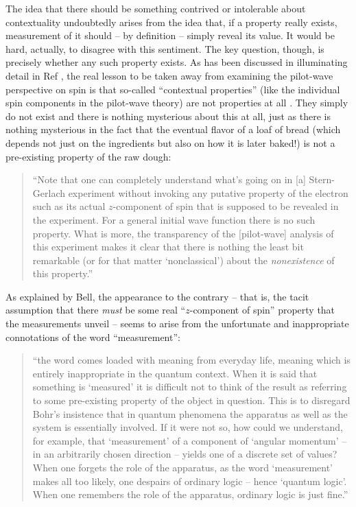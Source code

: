 \documentclass[aps,prc,onecolumn,letterpaper,floatfix,12pt]{revtex4}
\begin{document}
The idea that there should be something contrived or intolerable about
contextuality undoubtedly arises from the idea that, if a property
really exists, measurement of it should -- by definition -- 
simply reveal its value.  It
would be hard, actually, to disagree with this sentiment.  The key
question, though, is precisely whether any such property exists.  As
has been discussed in illuminating detail in Ref \cite{nrao},
the real lesson to be taken away from examining the
pilot-wave perspective on spin is that so-called ``contextual
properties'' (like the individual spin components in the pilot-wave
theory) are not properties at all \cite{history}.  They simply do not exist and
there is nothing mysterious about this at all, just as there is
nothing mysterious in the fact that the 
eventual flavor of a loaf of bread (which depends not just on
the ingredients but also on how it is later baked!) is not a pre-existing
property of the raw dough:
\begin{quote}
``Note that one can completely understand what's going on in
[a] Stern-Gerlach experiment without invoking any putative property of
the electron such as its actual $z$-component of spin that is supposed
to be revealed in the experiment.  For a general initial wave function
there is no such property.  What is more, the transparency of the [pilot-wave]
analysis of this experiment makes it clear that there is nothing the
least bit remarkable (or for that matter `nonclassical') about the
\emph{nonexistence} of this property.''  \cite{qeop}
\end{quote}
As explained by Bell, the appearance to the contrary -- that is, the
tacit assumption that there \emph{must} be some real ``$z$-component
of spin'' property that the measurements unveil -- seems to arise from
the unfortunate and inappropriate connotations of the word
``measurement'':  
\begin{quote}
``the word comes loaded with meaning from everyday life, meaning which
is entirely inappropriate in the quantum context.  When it is said
that something is `measured' it is difficult not to think of the
result as referring to some pre-existing property of the object in
question.  This is to disregard Bohr's insistence that in quantum
phenomena the apparatus as well as the system is essentially
involved.  If it were not so, how could we understand, for example,
that `measurement' of a component of `angular momentum' -- in an
arbitrarily chosen direction -- yields one of a discrete set of
values?  When one forgets the role of the apparatus, as the word
`measurement' makes all too likely, one despairs of ordinary logic --
hence `quantum logic'.  When one remembers the role of the apparatus,
ordinary logic is just fine.''  \cite{against}
\end{quote}
\end{document}
